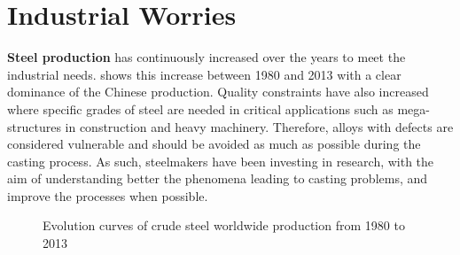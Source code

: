 \section{Industrial Worries}
\textbf{Steel production} has continuously increased over the years to meet the industrial needs.  shows this increase between 1980 and 2013 with a 
clear dominance of the Chinese production. Quality constraints have also increased where specific grades of steel are needed in critical applications such as mega-structures
in construction and  heavy machinery. Therefore, alloys with defects are considered vulnerable and should be avoided as much as possible during the casting process. As such, steelmakers have been investing
in research, with the aim of understanding better the phenomena leading to casting problems, and improve the processes when possible.
\begin{figure}[htbp]
\centering
{}
\caption{Evolution curves of crude steel worldwide production from 1980 to 2013}
\label{fig:steel_production}
\end{figure}

